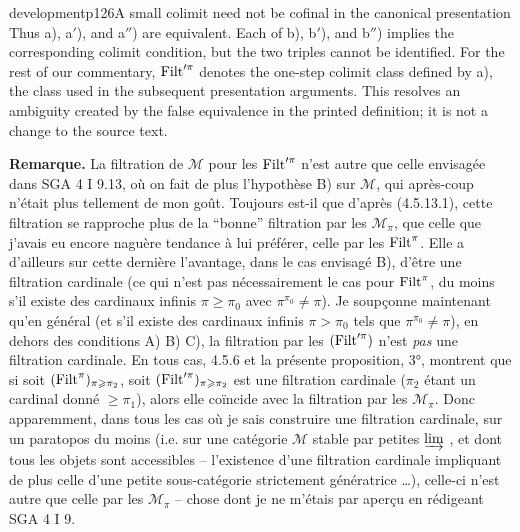 \begin{dcomment}{development}{p126}{A small colimit need not be cofinal in the canonical presentation}
Thus a), a$'$), and a$''$) are equivalent. Each of b), b$'$), and b$''$) implies the corresponding colimit condition, but the two triples cannot be identified. For the rest of our commentary, $\operatorname{Filt}'^\pi$ denotes the one-step colimit class defined by a), the class used in the subsequent presentation arguments. This resolves an ambiguity created by the false equivalence in the printed definition; it is not a change to the source text.
\end{dcomment}


\textbf{Remarque.} La filtration de $\mathcal{M}$ pour les $\operatorname{Filt}'^{\pi}$ n'est autre que celle envisagée dans SGA 4 I 9.13, où on fait de plus l'hypothèse B) sur $\mathcal{M}$, qui après-coup n'était plus tellement de mon goût. Toujours est-il que d'après (4.5.13.1), cette filtration se rapproche plus de la ``bonne'' filtration par les $\mathcal{M}_{\pi}$, que celle que j'avais eu encore naguère tendance à lui préférer, celle par les $\operatorname{Filt}^{\pi}$. Elle a d'ailleurs sur cette dernière l'avantage, dans le cas envisagé B), d'être une filtration cardinale (ce qui n'est pas nécessairement le cas pour $\operatorname{Filt}^{\pi}$, du moins s'il existe des cardinaux infinis $\pi \geqslant \pi_0$ avec $\pi^{\pi_0} \neq \pi$). Je soupçonne maintenant qu'en général (et s'il existe des cardinaux infinis $\pi > \pi_0$ tels que $\pi^{\pi_0} \neq \pi$), en dehors des conditions A) B) C), la filtration par les $(\operatorname{Filt}'^{\pi})$ n'est \textit{pas} une
filtration cardinale. En tous cas, 4.5.6 et la présente proposition, 3°, montrent que si soit $(\operatorname{Filt}^{\pi})_{\pi\geqslant\pi_2}$, soit $(\operatorname{Filt}'^{\pi})_{\pi\geqslant\pi_2}$ est une filtration cardinale ($\pi_2$ étant un cardinal donné $\geqslant \pi_1$), alors elle coïncide avec la filtration par les $\mathcal{M}_{\pi}$. Donc apparemment, dans tous les cas où je sais construire une filtration cardinale, sur un paratopos du moins (i.e. sur une catégorie $\mathcal{M}$ stable par petites $\varinjlim$ , et dont tous les objets sont accessibles -- l'existence d'une filtration cardinale impliquant de plus celle d'une petite sous-catégorie strictement génératrice \dots), celle-ci n'est autre que celle par les $\mathcal{M}_{\pi}$ -- chose dont je ne m'étais par aperçu en rédigeant SGA 4 I 9. %

